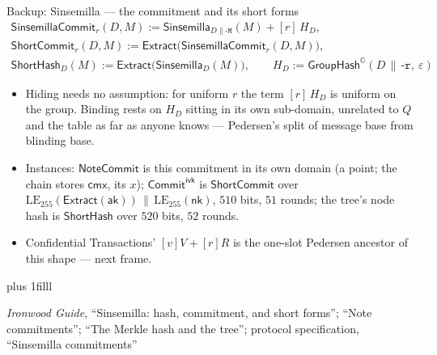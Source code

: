 \documentclass[aspectratio=169,11pt]{beamer}
\newcommand{\G}{\mathbb{G}}
\newcommand{\cmx}{\ensuremath{\mathsf{cmx}}}
\newcommand{\aksym}{\ensuremath{\mathsf{ak}}}
\newcommand{\nksym}{\ensuremath{\mathsf{nk}}}
\newcommand{\Extract}{\ensuremath{\mathsf{Extract}}}
\newcommand{\NoteCommit}{\ensuremath{\mathsf{NoteCommit}}}
\newcommand{\GroupHash}{\ensuremath{\mathsf{GroupHash}}}
\newcommand{\CommitIvk}{\ensuremath{\mathsf{Commit}^{\mathsf{ivk}}}}
\newcommand{\src}[1]{\par\vskip0pt plus 1filll
  {\fontsize{6}{7.2}\selectfont\color{arbdim}\raggedright #1\par}}
\begin{document}
\begin{frame}{Backup: Sinsemilla --- the commitment and its short forms}
\vspace*{-8pt}
\setlength{\abovedisplayskip}{3pt}\setlength{\belowdisplayskip}{3pt}
\begin{gather*}
\mathsf{SinsemillaCommit}_r(D, M) := \mathsf{Sinsemilla}_{D\|\texttt{-M}}(M)
  + [r]\,H_D,\\
\mathsf{ShortCommit}_r(D, M) := \Extract\bigl(\mathsf{SinsemillaCommit}_r(D,
  M)\bigr), \\
\mathsf{ShortHash}_D(M) := \Extract\bigl(\mathsf{Sinsemilla}_D(M)\bigr),
\qquad
H_D := \GroupHash^{\G}(D \,\|\, \texttt{-r},\ \varepsilon)
\end{gather*}
\begin{itemize}\small
  \item Hiding needs no assumption: for uniform $r$ the term $[r]\,H_D$ is
    uniform on the group. Binding rests on $H_D$ sitting in its own
    sub-domain, unrelated to $Q$ and the table as far as anyone knows ---
    Pedersen's split of message base from blinding base.
  \item Instances: $\NoteCommit$ is this commitment in its own domain
    (a point; the chain stores $\cmx$, its $x$); $\CommitIvk$ is
    $\mathsf{ShortCommit}$ over $\mathrm{LE}_{255}(\Extract(\aksym))
    \,\|\, \mathrm{LE}_{255}(\nksym)$, $510$ bits, $51$ rounds; the
    tree's node hash is $\mathsf{ShortHash}$ over $520$ bits, $52$ rounds.
  \item Confidential Transactions' $[v]V + [r]R$ is the one-slot Pedersen
    ancestor of this shape --- next frame.
\end{itemize}
\src{\emph{Ironwood Guide}, ``Sinsemilla: hash, commitment, and short forms'';
``Note commitments''; ``The Merkle hash and the tree''; protocol specification,
``Sinsemilla commitments''}
\end{frame}
\end{document}
